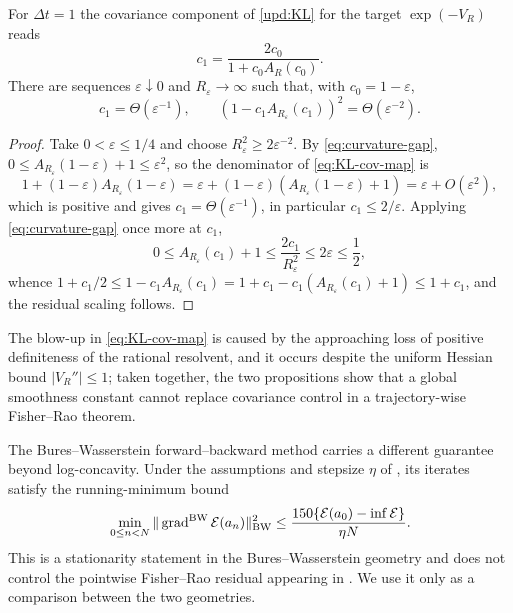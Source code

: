 \begin{proposition}\label{prop:pole-KL}
    For $\Delta t = 1$ the covariance component of \eqref{upd:KL} for the target $\exp (-V_R)$ reads
    \begin{equation}\label{eq:KL-cov-map}
        c_1 = \frac{2 c_0}{1 + c_0 A_R (c_0)}.
    \end{equation}
    There are sequences $\varepsilon \downarrow 0$ and $R_\varepsilon \to \infty$ such that, with $c_0 = 1 - \varepsilon$,
    \begin{equation*}
        c_1 = \Theta (\varepsilon^{-1}), \qquad \left( 1 - c_1 A_{R_\varepsilon} (c_1) \right)^2 = \Theta (\varepsilon^{-2}).
    \end{equation*}
\end{proposition}

\begin{proof}
    Take $0 < \varepsilon \leq 1/4$ and choose $R_\varepsilon^2 \geq 2 \varepsilon^{-2}$. By \eqref{eq:curvature-gap}, $0 \leq A_{R_\varepsilon} (1 - \varepsilon) + 1 \leq \varepsilon^2$, so the denominator of \eqref{eq:KL-cov-map} is
    \begin{equation*}
        1 + (1 - \varepsilon) A_{R_\varepsilon} (1 - \varepsilon) = \varepsilon + (1 - \varepsilon) \left( A_{R_\varepsilon} (1 - \varepsilon) + 1 \right) = \varepsilon + O (\varepsilon^2),
    \end{equation*}
    which is positive and gives $c_1 = \Theta (\varepsilon^{-1})$, in particular $c_1 \leq 2 / \varepsilon$. Applying \eqref{eq:curvature-gap} once more at $c_1$,
    \begin{equation*}
        0 \leq A_{R_\varepsilon} (c_1) + 1 \leq \frac{2 c_1}{R_\varepsilon^2} \leq 2 \varepsilon \leq \frac{1}{2},
    \end{equation*}
    whence $1 + c_1 / 2 \leq 1 - c_1 A_{R_\varepsilon} (c_1) = 1 + c_1 - c_1 (A_{R_\varepsilon} (c_1) + 1) \leq 1 + c_1$, and the residual scaling follows.
\end{proof}

The blow-up in \eqref{eq:KL-cov-map} is caused by the approaching loss of positive definiteness of the rational resolvent, and it occurs despite the uniform Hessian bound $|V_R''| \leq 1$; taken together, the two propositions show that a global smoothness constant cannot replace covariance control in a trajectory-wise Fisher--Rao theorem.

The Bures--Wasserstein forward--backward method carries a different guarantee beyond log-concavity. Under the assumptions and stepsize $\eta$ of \citet[Theorem~5.5]{diao2023forward}, its iterates satisfy the running-minimum bound
\begin{equation*}
    \min_{0 \leq n < N} \| \operatorname{grad}^{\mathrm{BW}} \mathcal{E} (a_n) \|_{\mathrm{BW}}^2 \leq \frac{150 \{ \mathcal{E} (a_0) - \inf \mathcal{E} \}}{\eta N}.
\end{equation*}
This is a stationarity statement in the Bures--Wasserstein geometry and does not control the pointwise Fisher--Rao residual appearing in . We use it only as a comparison between the two geometries.


